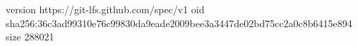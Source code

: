 version https://git-lfs.github.com/spec/v1
oid sha256:36c3ad99310e76c99830da9eade2009bee3a3447de02bd75cc2a0c8b6415e894
size 288021
